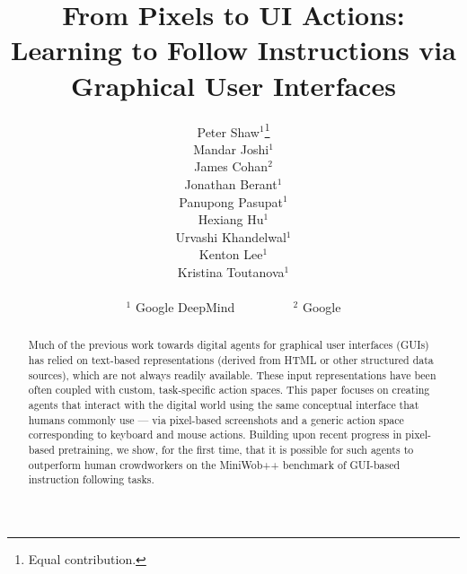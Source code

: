 \documentclass{article}
\title{From Pixels to UI Actions: Learning to Follow Instructions via Graphical User Interfaces}
\author{%
  Peter Shaw$^1$\thanks{Equal contribution.}  \\
  \And 
  Mandar Joshi$^1$\footnotemark[1] \\
  \And
  James Cohan$^2$ \\
  \And
  Jonathan Berant$^1$ \\
  \And
  Panupong Pasupat$^1$ \\
  \And
  Hexiang Hu$^1$ \\
  \And
  Urvashi Khandelwal$^1$ \\
  \And
  Kenton Lee$^1$ \\
  \And
  Kristina Toutanova$^1$
  \\
  \\
 $^1$ Google DeepMind ~~~~~~~~ $^2$ Google
}
\begin{document}
\maketitle

\begin{abstract}
Much of the previous work towards digital agents for graphical user interfaces (GUIs) has relied on text-based representations (derived from HTML or other structured data sources), which are not always readily available. These input representations have been often coupled with custom, task-specific action spaces.  This paper focuses on creating agents that interact with the digital world using the same conceptual interface that humans commonly use — via pixel-based screenshots and a generic action space corresponding to keyboard and mouse actions. Building upon recent progress in pixel-based pretraining, we show, for the first time, that it is possible for such agents to outperform human crowdworkers on the 
MiniWob++ benchmark of GUI-based instruction following tasks.
\end{abstract}












\appendix


\end{document}
